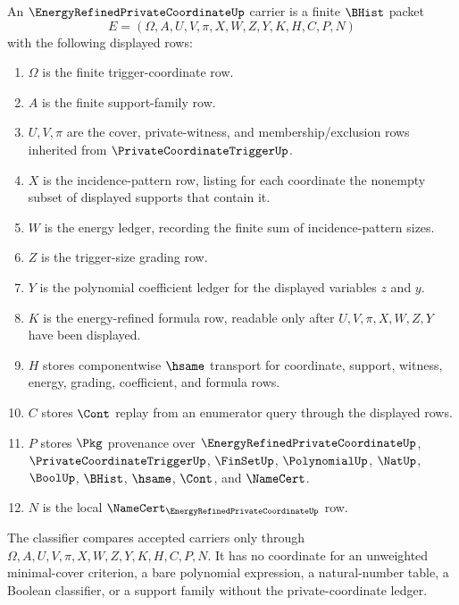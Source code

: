 \begin{definition}
\label{def:energy-refined-private-coordinate-carrier}
An $\EnergyRefinedPrivateCoordinateUp$ carrier is a finite $\BHist$ packet
$$
E=(\Omega,A,U,V,\pi,X,W,Z,Y,K,H,C,P,N)
$$
with the following displayed rows:
\begin{enumerate}
\item $\Omega$ is the finite trigger-coordinate row.
\item $A$ is the finite support-family row.
\item $U,V,\pi$ are the cover, private-witness, and membership/exclusion rows inherited from $\PrivateCoordinateTriggerUp$.
\item $X$ is the incidence-pattern row, listing for each coordinate the nonempty subset of displayed supports that contain it.
\item $W$ is the energy ledger, recording the finite sum of incidence-pattern sizes.
\item $Z$ is the trigger-size grading row.
\item $Y$ is the polynomial coefficient ledger for the displayed variables $z$ and $y$.
\item $K$ is the energy-refined formula row, readable only after $U,V,\pi,X,W,Z,Y$ have been displayed.
\item $H$ stores componentwise $\hsame$ transport for coordinate, support, witness, energy, grading, coefficient, and formula rows.
\item $C$ stores $\Cont$ replay from an enumerator query through the displayed rows.
\item $P$ stores $\Pkg$ provenance over $\EnergyRefinedPrivateCoordinateUp$, $\PrivateCoordinateTriggerUp$, $\FinSetUp$, $\PolynomialUp$, $\NatUp$, $\BoolUp$, $\BHist$, $\hsame$, $\Cont$, and $\NameCert$.
\item $N$ is the local $\NameCert_{\EnergyRefinedPrivateCoordinateUp}$ row.
\end{enumerate}
The classifier compares accepted carriers only through $\Omega,A,U,V,\pi,X,W,Z,Y,K,H,C,P,N$. It has no coordinate for an unweighted minimal-cover criterion, a bare polynomial expression, a natural-number table, a Boolean classifier, or a support family without the private-coordinate ledger.
\end{definition}

